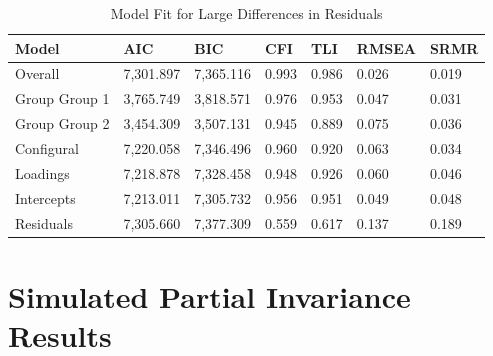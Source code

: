 \documentclass[
  man]{apa7}
\begin{document}
\begin{table}[tbp]

\begin{center}
\begin{threeparttable}

\caption{\label{tab:tab10}Model Fit for Large Differences in Residuals}

\begin{tabular}{lllllll}
\toprule
Model & AIC & BIC & CFI & TLI & RMSEA & SRMR\\
\midrule
Overall & 7,301.897 & 7,365.116 & 0.993 & 0.986 & 0.026 & 0.019\\
Group Group 1 & 3,765.749 & 3,818.571 & 0.976 & 0.953 & 0.047 & 0.031\\
Group Group 2 & 3,454.309 & 3,507.131 & 0.945 & 0.889 & 0.075 & 0.036\\
Configural & 7,220.058 & 7,346.496 & 0.960 & 0.920 & 0.063 & 0.034\\
Loadings & 7,218.878 & 7,328.458 & 0.948 & 0.926 & 0.060 & 0.046\\
Intercepts & 7,213.011 & 7,305.732 & 0.956 & 0.951 & 0.049 & 0.048\\
Residuals & 7,305.660 & 7,377.309 & 0.559 & 0.617 & 0.137 & 0.189\\
\bottomrule
\end{tabular}

\end{threeparttable}
\end{center}

\end{table}

\section{Simulated Partial Invariance Results}\label{simulated-partial-invariance-results}
\end{document}
